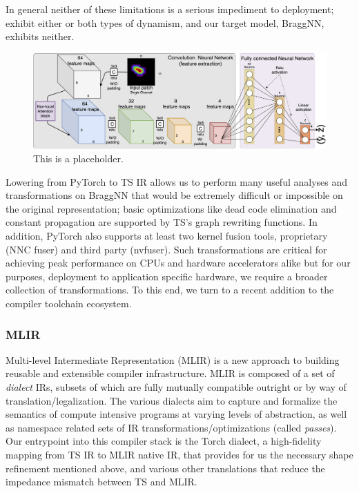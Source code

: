 In general neither of these limitations is a serious impediment to deployment;  exhibit either or both types of dynamism, and our target model, BraggNN, exhibits neither.
\begin{figure}
	\includegraphics[width=\textwidth]{figures/BraggNN}
	\caption{This is a placeholder.}
\end{figure}
Lowering from PyTorch to TS IR allows us to perform many useful analyses and transformations on BraggNN that would be extremely difficult or impossible on the original representation;
basic optimizations like dead code elimination and constant propagation are supported by TS's graph rewriting functions.
In addition, PyTorch also supports at least two kernel fusion\cite{10.1145/2688500.2688521} tools, proprietary (NNC fuser) and third party (nvfuser).
Such transformations are critical for achieving peak performance on CPUs and hardware accelerators alike but for our purposes, deployment to application specific hardware, we require a broader collection of transformations.
To this end, we turn to a recent addition to the compiler toolchain ecosystem.

\subsubsection{MLIR}\label{subsec:mlir}

Multi-level Intermediate Representation\cite{https://doi.org/10.48550/arxiv.2002.11054} (MLIR) is a new approach to building reusable and extensible compiler infrastructure.
MLIR is composed of a set of \emph{dialect} IRs, subsets of which are fully mutually compatible outright or by way of translation/legalization.
The various dialects aim to capture and formalize the semantics of compute intensive programs at varying levels of abstraction, as well as namespace related sets of IR transformations/optimizations (called \emph{passes}).
Our entrypoint into this compiler stack is the Torch dialect\cite{torch-mlir}, a high-fidelity mapping from TS IR to MLIR native IR, that provides for us the necessary shape refinement mentioned above, and various other translations that reduce the impedance mismatch between TS and MLIR.

